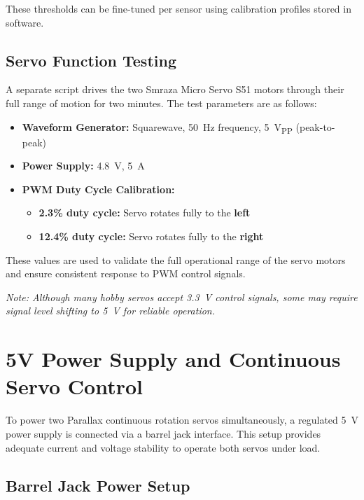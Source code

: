 \documentclass[conference]{IEEEtran}
\begin{document}
These thresholds can be fine-tuned per sensor using calibration profiles stored in software.

\subsection{Servo Function Testing}

A separate script drives the two Smraza Micro Servo S51 motors through their full range of motion for two minutes. The test parameters are as follows:

\begin{itemize}
    \item \textbf{Waveform Generator:} Squarewave, 50~Hz frequency, 5~V\textsubscript{PP} (peak-to-peak)
    \item \textbf{Power Supply:} 4.8~V, 5~A
    \item \textbf{PWM Duty Cycle Calibration:}
    \begin{itemize}
        \item \textbf{2.3\% duty cycle:} Servo rotates fully to the \textbf{left}
        \item \textbf{12.4\% duty cycle:} Servo rotates fully to the \textbf{right}
    \end{itemize}
\end{itemize}

These values are used to validate the full operational range of the servo motors and ensure consistent response to PWM control signals.

\textit{Note: Although many hobby servos accept 3.3~V control signals, some may require signal level shifting to 5~V for reliable operation.}

\section{5V Power Supply and Continuous Servo Control}

To power two Parallax continuous rotation servos simultaneously, a regulated 5~V power supply is connected via a barrel jack interface. This setup provides adequate current and voltage stability to operate both servos under load.

\subsection{Barrel Jack Power Setup}
\end{document}
